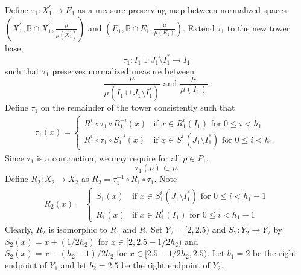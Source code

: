 \documentclass[12pt]{amsart}
\begin{document}
Define $\tau_1:X_1^{\prime}\to E_1$ as a measure preserving map between 
normalized spaces 
$(X_1^{\prime},\mathbb{B} \cap X_1^{\prime},\frac{\mu}{\mu (X_1^{\prime})})$ and 
$(E_1,\mathbb{B} \cap E_1,\frac{\mu}{\mu (E_1)})$. 
Extend $\tau_1$ to the new tower base, 
$$\tau_1:I_1 \cup J_1\setminus I_1^*\to I_1$$
such that $\tau_1$ preserves normalized measure between 
$$\frac{\mu}{\mu (I_1 \cup J_1\setminus I_1^*)}\mbox{ and }\frac{\mu}{\mu (I_1)}.$$
Define $\tau_1$ on the remainder of the tower consistently 
such that 
\begin{eqnarray*} 
\tau_1(x)= 
\left\{\begin{array}{ll}
R_1^{i}\circ \tau_1 \circ R_1^{-i}(x) & \mbox{if $x\in R_1^i(I_1)$ for $0\leq i<h_1$} \\ 
R_1^{i}\circ \tau_1 \circ S_1^{-i}(x) & \mbox{if $x\in S_1^{i}(J_1\setminus I_1^*)$ for $0\leq i<h_1$} . 
\end{array}
\right.
\end{eqnarray*}
Since $\tau_1$ is a contraction, we may require for all $p\in P_1$,
\[
\tau_1(p) \subset p .
\]
Define 
$R_2:X_2\to X_2$ as $R_2=\tau_1^{-1}\circ R_1\circ \tau_1$. Note 
\begin{eqnarray*} 
R_2(x)= 
\left\{\begin{array}{ll}
S_1(x) & \mbox{if $x\in S_1^{i}(J_1\setminus I_1^*)$ for $0\leq i<h_1-1$} \\ 
R_1(x) & \mbox{if $x\in R_1^{i}(I_1)$ for $0\leq i<h_1-1$} 
\end{array}
\right.
\end{eqnarray*}
Clearly, $R_2$ is isomorphic to $R_1$ and $R$. 
Set $Y_2 = [2,2.5)$ and $S_2:Y_2\to Y_2$ by 
$S_2(x) = x + ({1} / {2h_2})$ for $x\in [2,2.5 - {1} / {2h_2})$ and 
$S_2(x) = x - ({h_2 - 1}) / {2h_2}$ for $x\in [2.5 - {1} / {2h_2}, 2.5)$. 
Let $b_1 = 2$ be the right endpoint of $Y_1$ and let 
$b_2 = 2.5$ be the right endpoint of $Y_2$. 
\end{document}
